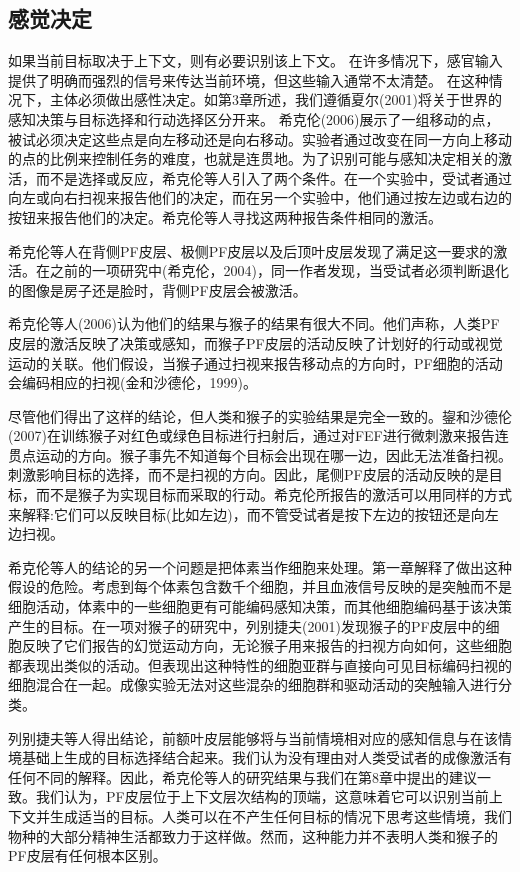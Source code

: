 \subsection{感觉决定}
\par
如果当前目标取决于上下文，则有必要识别该上下文。 在许多情况下，感官输入提供了明确而强烈的信号来传达当前环境，但这些输入通常不太清楚。 在这种情况下，主体必须做出感性决定。如第3章所述，我们遵循夏尔(2001)将关于世界的感知决策与目标选择和行动选择区分开来。
希克伦(2006)展示了一组移动的点，被试必须决定这些点是向左移动还是向右移动。实验者通过改变在同一方向上移动的点的比例来控制任务的难度，也就是连贯地。为了识别可能与感知决定相关的激活，而不是选择或反应，希克伦等人引入了两个条件。在一个实验中，受试者通过向左或向右扫视来报告他们的决定，而在另一个实验中，他们通过按左边或右边的按钮来报告他们的决定。希克伦等人寻找这两种报告条件相同的激活。
\par
希克伦等人在背侧PF皮层、极侧PF皮层以及后顶叶皮层发现了满足这一要求的激活。在之前的一项研究中(希克伦，2004)，同一作者发现，当受试者必须判断退化的图像是房子还是脸时，背侧PF皮层会被激活。
\par
希克伦等人(2006)认为他们的结果与猴子的结果有很大不同。他们声称，人类PF皮层的激活反映了决策或感知，而猴子PF皮层的活动反映了计划好的行动或视觉运动的关联。他们假设，当猴子通过扫视来报告移动点的方向时，PF细胞的活动会编码相应的扫视(金和沙德伦，1999)。
\par
尽管他们得出了这样的结论，但人类和猴子的实验结果是完全一致的。鋆和沙德伦(2007)在训练猴子对红色或绿色目标进行扫射后，通过对FEF进行微刺激来报告连贯点运动的方向。猴子事先不知道每个目标会出现在哪一边，因此无法准备扫视。刺激影响目标的选择，而不是扫视的方向。因此，尾侧PF皮层的活动反映的是目标，而不是猴子为实现目标而采取的行动。希克伦所报告的激活可以用同样的方式来解释:它们可以反映目标(比如左边)，而不管受试者是按下左边的按钮还是向左边扫视。
\par
希克伦等人的结论的另一个问题是把体素当作细胞来处理。第一章解释了做出这种假设的危险。考虑到每个体素包含数千个细胞，并且血液信号反映的是突触而不是细胞活动，体素中的一些细胞更有可能编码感知决策，而其他细胞编码基于该决策产生的目标。在一项对猴子的研究中，列别捷夫(2001)发现猴子的PF皮层中的细胞反映了它们报告的幻觉运动方向，无论猴子用来报告的扫视方向如何，这些细胞都表现出类似的活动。但表现出这种特性的细胞亚群与直接向可见目标编码扫视的细胞混合在一起。成像实验无法对这些混杂的细胞群和驱动活动的突触输入进行分类。
\par
列别捷夫等人得出结论，前额叶皮层能够将与当前情境相对应的感知信息与在该情境基础上生成的目标选择结合起来。我们认为没有理由对人类受试者的成像激活有任何不同的解释。因此，希克伦等人的研究结果与我们在第8章中提出的建议一致。我们认为，PF皮层位于上下文层次结构的顶端，这意味着它可以识别当前上下文并生成适当的目标。人类可以在不产生任何目标的情况下思考这些情境，我们物种的大部分精神生活都致力于这样做。然而，这种能力并不表明人类和猴子的PF皮层有任何根本区别。

